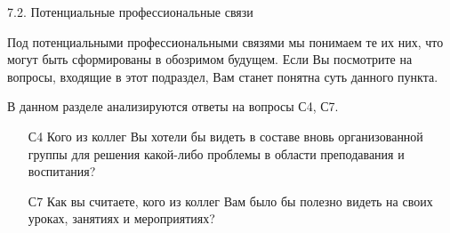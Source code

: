 \begin{frame}{7.2. Потенциальные профессиональные связи }

\tiny
Под потенциальными профессиональными связями мы понимаем те их них, что могут быть сформированы в обозримом будущем. Если Вы посмотрите на вопросы, входящие в этот подраздел, Вам станет понятна суть данного пункта.
\bigskip

В данном разделе анализируются ответы на вопросы С4, С7.
\bigskip

\begin{itemize}

\item [С4] Кого из коллег Вы хотели бы видеть в составе вновь организованной группы для решения какой-либо проблемы в области преподавания и воспитания?

\item [С7] Как вы считаете, кого из коллег Вам было бы полезно видеть на своих уроках, занятиях и мероприятиях?

\end{itemize}
\end{frame}


